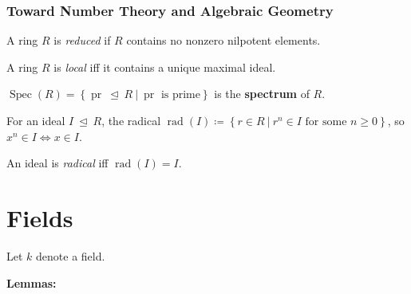 \hypertarget{toward-number-theory-and-algebraic-geometry}{%
\subsubsection{Toward Number Theory and Algebraic
Geometry}\label{toward-number-theory-and-algebraic-geometry}}

\begin{definition}

A ring \(R\) is \emph{reduced} if \(R\) contains no nonzero nilpotent
elements.

\end{definition}

\begin{definition}

A ring \(R\) is \emph{local} iff it contains a unique maximal ideal.

\end{definition}

\begin{definition}

\(\operatorname{Spec}(R) = \left\{{{\operatorname{pr}}{~\trianglelefteq~}R {~\mathrel{\Big|}~}{\operatorname{pr}}\text{ is prime}}\right\}\)
is the \textbf{spectrum} of \(R\).

\end{definition}

\begin{definition}

For an ideal \(I{~\trianglelefteq~}R\), the radical
\({\operatorname{rad}}(I) \coloneqq\left\{{r\in R{~\mathrel{\Big|}~}r^n\in I\text{ for some } n\geq 0}\right\}\),
so \(x^n \in I \iff x\in I\).

\end{definition}

\begin{definition}

An ideal is \emph{radical} iff \({\operatorname{rad}}(I) = I\).

\end{definition}

\hypertarget{fields}{%
\section{Fields}\label{fields}}

Let \(k\) denote a field.

\textbf{Lemmas:}

